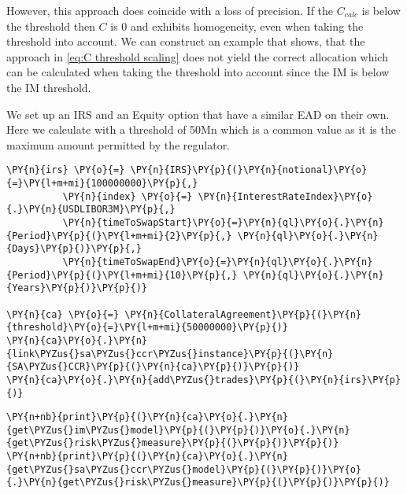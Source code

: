     However, this approach does coincide with a loss of precision. If the
\(C_{calc}\) is below the threshold then \(C\) is 0 and exhibits
homogeneity, even when taking the threshold into account. We can
construct an example that shows, that the approach in
\ref{eq:C threshold scaling} does not yield the correct allocation which
can be calculated when taking the threshold into account since the IM is
below the IM threshold.

We set up an IRS and an Equity option that have a similar EAD on their
own. Here we calculate with a threshold of 50Mn which is a common value
as it is the maximum amount permitted by the regulator.

    \begin{tcolorbox}[breakable, size=fbox, boxrule=1pt, pad at break*=1mm,colback=cellbackground, colframe=cellborder]
\begin{Verbatim}[commandchars=\\\{\}]
\PY{n}{irs} \PY{o}{=} \PY{n}{IRS}\PY{p}{(}\PY{n}{notional}\PY{o}{=}\PY{l+m+mi}{100000000}\PY{p}{,}
          \PY{n}{index} \PY{o}{=} \PY{n}{InterestRateIndex}\PY{o}{.}\PY{n}{USDLIBOR3M}\PY{p}{,}
          \PY{n}{timeToSwapStart}\PY{o}{=}\PY{n}{ql}\PY{o}{.}\PY{n}{Period}\PY{p}{(}\PY{l+m+mi}{2}\PY{p}{,} \PY{n}{ql}\PY{o}{.}\PY{n}{Days}\PY{p}{)}\PY{p}{,}
          \PY{n}{timeToSwapEnd}\PY{o}{=}\PY{n}{ql}\PY{o}{.}\PY{n}{Period}\PY{p}{(}\PY{l+m+mi}{10}\PY{p}{,} \PY{n}{ql}\PY{o}{.}\PY{n}{Years}\PY{p}{)}\PY{p}{)}

\PY{n}{ca} \PY{o}{=} \PY{n}{CollateralAgreement}\PY{p}{(}\PY{n}{threshold}\PY{o}{=}\PY{l+m+mi}{50000000}\PY{p}{)}
\PY{n}{ca}\PY{o}{.}\PY{n}{link\PYZus{}sa\PYZus{}ccr\PYZus{}instance}\PY{p}{(}\PY{n}{SA\PYZus{}CCR}\PY{p}{(}\PY{n}{ca}\PY{p}{)}\PY{p}{)}
\PY{n}{ca}\PY{o}{.}\PY{n}{add\PYZus{}trades}\PY{p}{(}\PY{n}{irs}\PY{p}{)}
\end{Verbatim}
\end{tcolorbox}

    \begin{tcolorbox}[breakable, size=fbox, boxrule=1pt, pad at break*=1mm,colback=cellbackground, colframe=cellborder]
\begin{Verbatim}[commandchars=\\\{\}]
\PY{n+nb}{print}\PY{p}{(}\PY{n}{ca}\PY{o}{.}\PY{n}{get\PYZus{}im\PYZus{}model}\PY{p}{(}\PY{p}{)}\PY{o}{.}\PY{n}{get\PYZus{}risk\PYZus{}measure}\PY{p}{(}\PY{p}{)}\PY{p}{)}
\PY{n+nb}{print}\PY{p}{(}\PY{n}{ca}\PY{o}{.}\PY{n}{get\PYZus{}sa\PYZus{}ccr\PYZus{}model}\PY{p}{(}\PY{p}{)}\PY{o}{.}\PY{n}{get\PYZus{}risk\PYZus{}measure}\PY{p}{(}\PY{p}{)}\PY{p}{)}
\end{Verbatim}
\end{tcolorbox}

